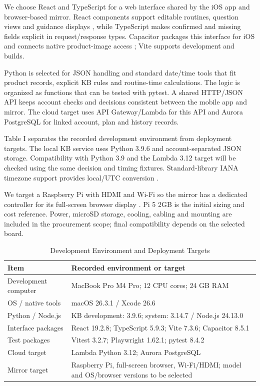 \documentclass[conference,letterpaper]{IEEEtran}
\begin{document}
We choose React and TypeScript for a web interface shared by the iOS app and browser-based mirror. React components support editable routines, question views and guidance displays \cite{ref4}, while TypeScript makes confirmed and missing fields explicit in request/response types. Capacitor packages this interface for iOS and connects native product-image access \cite{ref5}; Vite supports development and builds.

Python is selected for JSON handling and standard date/time tools that fit product records, explicit KB rules and routine-time calculations. The logic is organized as functions that can be tested with pytest. A shared HTTP/JSON API keeps account checks and decisions consistent between the mobile app and mirror. The cloud target uses API Gateway/Lambda for this API and Aurora PostgreSQL for linked account, plan and history records.

Table I separates the recorded development environment from deployment targets. The local KB service uses Python 3.9.6 and account-separated JSON storage. Compatibility with Python 3.9 and the Lambda 3.12 target will be checked using the same decision and timing fixtures. Standard-library IANA timezone support provides local/UTC conversion \cite{ref6}.

We target a Raspberry Pi with HDMI and Wi-Fi so the mirror has a dedicated controller for its full-screen browser display \cite{ref7}. Pi 5 2GB is the initial sizing and cost reference. Power, microSD storage, cooling, cabling and mounting are included in the procurement scope; final compatibility depends on the selected board.

\begin{table}[!t]
\caption{Development Environment and Deployment Targets}\label{tab:env}
\centering\footnotesize
\renewcommand{\arraystretch}{1.12}\setlength{\tabcolsep}{3pt}
\begin{tabularx}{\columnwidth}{@{}>{\raggedright\arraybackslash}X>{\raggedright\arraybackslash}X@{}}\toprule
\textbf{Item} & \textbf{Recorded environment or target}\\\midrule
Development computer & MacBook Pro M4 Pro; 12 CPU cores; 24 GB RAM\\
OS / native tools & macOS 26.3.1 / Xcode 26.6\\
Python / Node.js & KB development: 3.9.6; system: 3.14.7 / Node.js 24.13.0\\
Interface packages & React 19.2.8; TypeScript 5.9.3; Vite 7.3.6; Capacitor 8.5.1\\
Test packages & Vitest 3.2.7; Playwright 1.62.1; pytest 8.4.2\\
Cloud target & Lambda Python 3.12; Aurora PostgreSQL\\
Mirror target & Raspberry Pi, full-screen browser, Wi-Fi/HDMI; model and OS/browser versions to be selected\\
\bottomrule
\end{tabularx}
\end{table}
\end{document}
